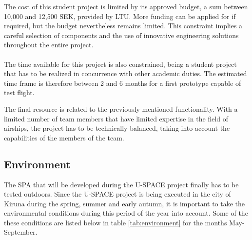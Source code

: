 \noindent
The cost of this student project is limited by its approved budget, a sum between 10,000 and 12,500 SEK, provided by \ac{LTU}. More funding can be applied for if required, but the budget nevertheless remains limited. This constraint implies a careful selection of components and the use of innovative engineering solutions throughout the entire project. 
\\
\\
The time available for this project is also constrained, being a student project that has to be realized in concurrence with other academic duties. The estimated time frame is therefore between 2 and 6 months for a first prototype capable of test flight.

\pagebreak

\noindent
The final resource is related to the previously mentioned functionality. With a limited number of team members that have limited expertise in the field of airships, the project has to be technically balanced, taking into account the capabilities of the members of the team.

\subsection{Environment}

The \ac{SPA} that will be developed during the \ac{U-SPACE} project finally has to be tested outdoors. Since the \ac{U-SPACE} project is being executed in the city of Kiruna during the spring, summer and early autumn, it is important to take the environmental conditions during this period of the year into account.  Some of the these conditions are listed below in table \ref{tab:environment} for the months May-September\cite{website:weatherspark}.

\begin{table}[H]
\centering
\caption{Environmental conditions}
\label{tab:environment}
\end{table}

